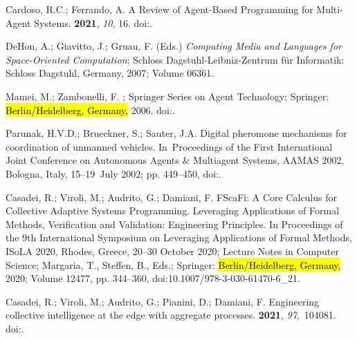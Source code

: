 \documentclass[jsan,article,accept,moreauthors,pdftex]{Definitions/mdpi}
\begin{document}
\begin{thebibliography}{999}
Cardoso, R.C.; Ferrando, A.
\newblock A Review of Agent-Based Programming for Multi-Agent Systems.
 {\bf 2021}, {\em 10}, 16.
\newblock
  doi:{\href{https://doi.org/10.3390/computers10020016}{}}.

DeHon, A.; Giavitto, J.; Gruau, F. (Eds.)
\newblock \emph{Computing Media and Languages for Space-Oriented Computation}; Schloss Dagstuhl-Leibniz-Zentrum für Informatik: Schloss Dagstuhl, Germany, 2007; Volume 06361.

Mamei, M.; Zambonelli, F.
;
  Springer Series on Agent Technology; Springer:  \hl{Berlin/Heidelberg, Germany,} %
  2006.
\newblock
  doi:{\href{https://doi.org/10.1007/3-540-27969-5}{}}.

Parunak, H.V.D.; Brueckner, S.; Sauter, J.A.
\newblock Digital pheromone mechanisms for coordination of unmanned vehicles.
\newblock   In~Proceedings of the  First International Joint Conference on Autonomous Agents {\&}
  Multiagent Systems, {AAMAS} 2002,  Bologna, Italy, 15--19~July 2002;
pp. 449--450,
\newblock
  doi:{\href{https://doi.org/10.1145/544741.544843}{}}.

Casadei, R.; Viroli, M.; Audrito, G.; Damiani, F.
\newblock FScaFi: {A} Core Calculus for Collective Adaptive Systems
  Programming.
\newblock  Leveraging Applications of Formal Methods, Verification and
  Validation: Engineering Principles. In Proceedings of the 9th International Symposium on
  Leveraging Applications of Formal Methods, ISoLA 2020, Rhodes, Greece,
  20--30 October 2020; Lecture Notes in Computer Science; Margaria, T., Steffen, B., Eds.;
  Springer:  \hl{Berlin/Heidelberg, Germany,} %
 2020; Volume 12477,  pp.
  344--360,
\newblock
  doi:10.1007/978-3-030-61470-6\_21.

Casadei, R.; Viroli, M.; Audrito, G.; Pianini, D.; Damiani, F.
\newblock Engineering collective intelligence at the edge with aggregate
  processes.
 {\bf 2021}, {\em 97},~104081.
\newblock
  doi:{\href{https://doi.org/10.1016/j.engappai.2020.104081}{}}.


\end{thebibliography}
\end{document}
